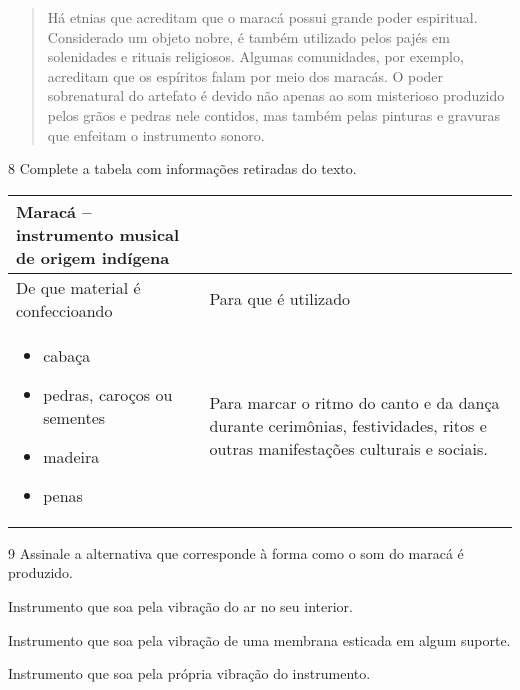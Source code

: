 \begin{escolha}
\begin{quote}
Há etnias que acreditam que o maracá possui grande poder espiritual. Considerado um objeto nobre, é também utilizado pelos pajés em solenidades e rituais religiosos. Algumas comunidades, por exemplo, acreditam que os espíritos falam por meio dos maracás. O poder sobrenatural do artefato é devido não apenas ao som misterioso produzido pelos grãos e pedras nele contidos, mas também pelas pinturas e gravuras que enfeitam o instrumento sonoro.

\end{quote}

\num{8}  Complete a tabela com informações retiradas do texto.

\begin{longtable}[]{@{}ll@{}}
\toprule
\textbf{Maracá -- instrumento musical de origem indígena}\tabularnewline
\midrule
\endhead
De que material é confeccioando & Para que é utilizado\tabularnewline
\begin{minipage}[t]{0.48\columnwidth}\raggedright\strut
\begin{itemize}
\item
  cabaça
\item
  pedras, caroços ou sementes
\item
  madeira
\item
  penas
\end{itemize}\strut
\end{minipage} & \begin{minipage}[t]{0.48\columnwidth}\raggedright\strut
Para marcar o ritmo do canto e da dança durante cerimônias,
festividades, ritos e outras manifestações culturais e sociais.\strut
\end{minipage}\tabularnewline
\bottomrule
\end{longtable}


\num{9}  Assinale a alternativa que corresponde à forma como o som do maracá é produzido.

\begin{boxlist}
 Instrumento que soa pela vibração do ar no seu interior.

 Instrumento que soa pela vibração de uma membrana esticada em algum suporte.

 Instrumento que soa pela própria vibração do instrumento.


\end{boxlist}
\end{escolha}
